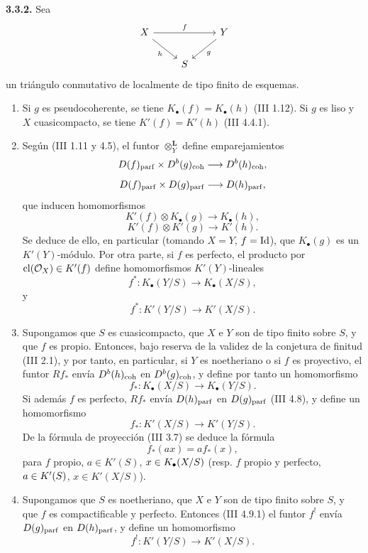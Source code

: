 \textbf{3.3.2.} Sea
\[
\begin{tikzcd}
X\arrow[rr,"f"]\arrow[dr,"h"'] &&Y\arrow[dl,"g"]\\
&S&
\end{tikzcd}
\]
un triángulo conmutativo de  localmente de tipo finito de esquemas.
\begin{enumerate}[label=\textbf{3.3.2.\arabic*.}, leftmargin=4em]
\item Si \(g\) es pseudocoherente, se tiene \(K_{\bullet}(f)=K_{\bullet}(h)\) (III 1.12). Si \(g\) es liso y \(X\) cuasicompacto, se tiene \(K'(f)=K'(h)\) (III 4.4.1).

\item Según (III 1.11 y 4.5), el funtor \(\otimes_Y^{\mathbf L}\) define emparejamientos
\[
 D(f)_{\parf}\times D^b(g)_{\coh}\longrightarrow D^b(h)_{\coh},
\]
\[
 D(f)_{\parf}\times D(g)_{\parf}\longrightarrow D(h)_{\parf},
\]
que inducen homomorfismos
\[
 K'(f)\otimes K_{\bullet}(g)\longrightarrow K_{\bullet}(h),
\]
\[
 K'(f)\otimes K'(g)\longrightarrow K'(h).
\]
Se deduce de ello, en particular (tomando \(X=Y\), \(f=\Id\)), que \(K_{\bullet}(g)\) es un \(K'(Y)\)-módulo. Por otra parte, si \(f\) es perfecto, el producto por \(\cl(\mathcal O_X)\in K'(f)\) define homomorfismos \(K'(Y)\)-lineales
\[
 f^*:K_{\bullet}(Y/S)\longrightarrow K_{\bullet}(X/S),
\]
y
\[
 f^*:K'(Y/S)\longrightarrow K'(X/S).
\]

\item Supongamos que \(S\) es cuasicompacto, que \(X\) e \(Y\) son de tipo finito sobre \(S\), y que \(f\) es propio. Entonces, bajo reserva de la validez de la conjetura de finitud (III 2.1), y por tanto, en particular, si \(Y\) es noetheriano o si \(f\) es proyectivo, el funtor \(Rf_*\) envía \(D^b(h)_{\coh}\) en \(D^b(g)_{\coh}\), y define por tanto un homomorfismo
\[
 f_*:K_{\bullet}(X/S)\longrightarrow K_{\bullet}(Y/S).
\]
Si además \(f\) es perfecto, \(Rf_*\) envía \(D(h)_{\parf}\) en \(D(g)_{\parf}\) (III 4.8), y define un homomorfismo
\[
 f_*:K'(X/S)\longrightarrow K'(Y/S).
\]
De la fórmula de proyección (III 3.7) se deduce la fórmula
\[
 f_*(a x)=a f_*(x),
\]
para \(f\) propio, \(a\in K'(S)\), \(x\in \sisi{K_{\bullet}(X)}{K_{\bullet}(X/S)}\) (resp. \(f\) propio y perfecto, \(a\in \sisi{K_{\bullet}(S)}{K'(S)}\), \(x\in K'(X/S)\)).

\item Supongamos que \(S\) es noetheriano, que \(X\) e \(Y\) son de tipo finito sobre \(S\), y que \(f\) es compactificable y perfecto. Entonces (III 4.9.1) el funtor \(f^!\) envía \(D(g)_{\parf}\) en \(D(h)_{\parf}\), y define un homomorfismo
\[
 f^!:K'(Y/S)\longrightarrow K'(X/S).
\]
\end{enumerate}

